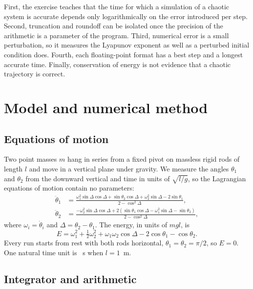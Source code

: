 \documentclass[prb,reprint,amsmath,amssymb,longbibliography]{revtex4-1}
\begin{document}
First, the exercise teaches that the time for which a simulation of a chaotic
system is accurate depends only logarithmically on the error introduced per
step. Second, truncation and roundoff can be isolated once the precision of the
arithmetic is a parameter of the program. Third, numerical error is a small
perturbation, so it measures the Lyapunov exponent as well as a perturbed
initial condition does. Fourth, each floating-point format has a best step and
a longest accurate time. Finally, conservation of energy is not evidence that a
chaotic trajectory is correct.
\fi

\section{Model and numerical method}

\subsection{Equations of motion}

Two point masses $m$ hang in series from a fixed pivot on massless rigid rods of
length $l$ and move in a vertical plane under gravity. We measure the angles
$\theta_1$ and $\theta_2$ from the downward vertical and time in units of
$\sqrt{l/g}$, so the Lagrangian equations of motion contain no parameters:
\begin{align}
\ddot\theta_1 &= \frac{\omega_1^2\sin\Delta\cos\Delta+\sin\theta_2\cos\Delta
                +\omega_2^2\sin\Delta-2\sin\theta_1}{2-\cos^2\Delta},\label{eq:eom1}\\
\ddot\theta_2 &= \frac{-\omega_2^2\sin\Delta\cos\Delta
                +2\left(\sin\theta_1\cos\Delta-\omega_1^2\sin\Delta-\sin\theta_2\right)}
                {2-\cos^2\Delta},\label{eq:eom2}
\end{align}
where $\omega_i=\dot\theta_i$ and $\Delta=\theta_2-\theta_1$. The energy, in
units of $mgl$, is
\begin{equation}
E=\omega_1^2+\tfrac12\omega_2^2+\omega_1\omega_2\cos\Delta-2\cos\theta_1-\cos\theta_2 .
\label{eq:energy}
\end{equation}
Every run starts from rest with both rods horizontal,
$\theta_1=\theta_2=\pi/2$, so $E=0$. One natural time unit is \secPerUnit~s when
$l=1$~m.

\subsection{Integrator and arithmetic}
\end{document}
